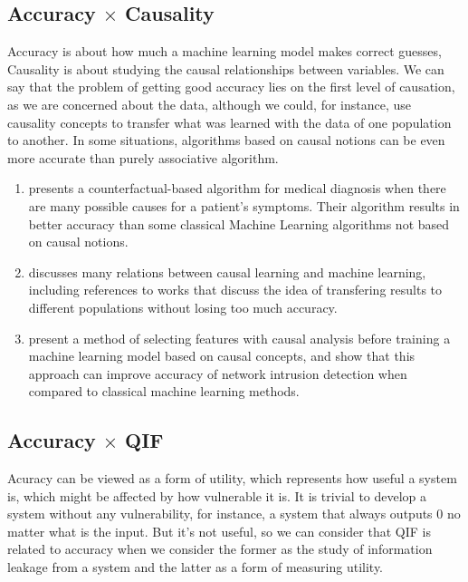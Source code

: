 \subsection{Accuracy $\times$ Causality}

Accuracy is about how much a machine learning model makes correct guesses, Causality is about studying the causal relationships between variables. We can say that the problem of getting good accuracy lies on the first level of causation, as we are concerned about the data, although we could, for instance, use causality concepts to transfer what was learned with the data of one population to another. In some situations, algorithms based on causal notions can be even more accurate than purely associative algorithm.

\begin{enumerate}
    \item \cite{Improving the accuracy of medical diagnosis with causal machine learning} presents a counterfactual-based algorithm for medical diagnosis when there are many possible causes for a patient's symptoms. Their algorithm results in better accuracy than some classical Machine Learning algorithms not based on causal notions.
    \item \cite{Causality for Machine Learning} discusses many relations between causal learning and machine learning, including references to works that discuss the idea of transfering results to different populations without losing too much accuracy.
    \item \cite{Improving the Accuracy of Network Intrusion Detection with Causal Machine Learning} present a method of selecting features with causal analysis before training a machine learning model based on causal concepts, and show that this approach can improve accuracy of network intrusion detection when compared to classical machine learning methods.
\end{enumerate}

\subsection{Accuracy $\times$ QIF}

Acuracy can be viewed as a form of utility, which represents how useful a system is, which might be affected by how vulnerable it is. It is trivial to develop a system without any vulnerability, for instance, a system that always outputs $0$ no matter what is the input. But it's not useful, so we can consider that QIF is related to accuracy when we consider the former as the study of information leakage from a system and the latter as a form of measuring utility.

